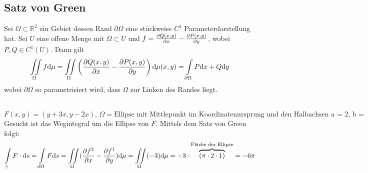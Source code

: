 	\subsection{Satz von Green}
		\begin{theorem}
			Sei $\Omega \subset \mathbb{R}^2$ ein Gebiet dessen Rand $\partial \Omega$ eine stückweise $C^1$ Parameterdarstellung hat. 
			Sei $U$ eine offene Menge mit $\Omega \subset U$ und $f = \pdiff{Q(x,y)}{x} - \pdiff{P(x,y)}{y}$, wobei $P,Q \in C^1(U)$. Dann gilt
			$$ \iint\limits_\Omega f \d \mu = \iint\limits_{\Omega} \left( \pdiff{Q(x,y)}{x} - \pdiff{P(x,y)}{y} \right) \d\mu(x,y) = \int\limits_{\partial\Omega} P \d x + Q \d y $$
			wobei $\partial\Omega$ so parametrisiert wird, dass $\Omega$ zur Linken des Randes liegt. 
		\end{theorem}
		\begin{hint}\hfill\\
		$F(x,y)=(y+3x,y-2x), \, \Omega = \text{Ellipse mit Mittlepunkt im Koordinatenursprung und den Halbachsen a = 2, b = 1}$
		Gesucht ist das Wegintegral um die Ellipse von $F$. Mittels dem Satz von Green folgt:
		$$ \int\limits_\gamma F \cdot \d s = \int\limits_{\partial\Omega} F \d s = \iint\limits_\Omega (\pdiff{f^2}{x}- \pdiff{f^1}{y}) \d \mu = 
		\iint\limits_\Omega (-3) \d \mu = -3\cdot \overbrace{(\pi \cdot 2 \cdot 1)}^{\text{Fläche der Ellipse}} = -6 \pi$$
		\end{hint}